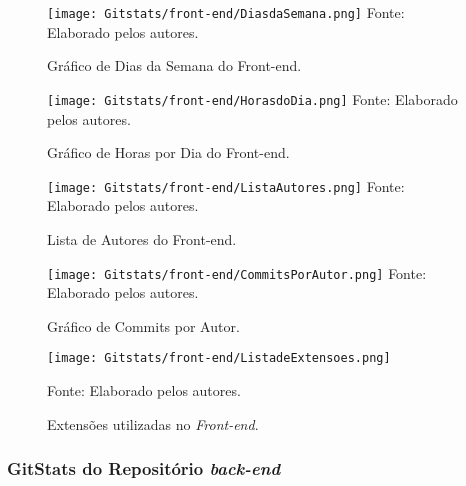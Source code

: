 \documentclass[
    12pt,               %
    openright,          %
    oneside,
    a4paper,            %
    BIBLATEX,           %
    TODO,               %
    english,            %
    brazil              %
    ]{ifsp-spo-inf-ctds}
\begin{document}
        \begin{figure}[H]
                \centering
                \caption{Gráfico de Dias da Semana do  Front-end.}
                \texttt{[image: Gitstats/front-end/DiasdaSemana.png]}
                {\footnotesize Fonte: Elaborado pelos autores.}
                \label{fig:diasemanaFront}
        \end{figure}  

        \begin{figure}[H]
                \centering
                \caption{Gráfico de Horas por Dia do Front-end.}
                \texttt{[image: Gitstats/front-end/HorasdoDia.png]}
                {\footnotesize Fonte: Elaborado pelos autores.}
                \label{fig:horasFront}
        \end{figure} 

        \begin{figure}[H]
                \centering
                \caption{Lista de Autores do
                Front-end.}
                \texttt{[image: Gitstats/front-end/ListaAutores.png]}
                {\footnotesize Fonte: Elaborado pelos autores.}
                \label{fig:autorFront}
        \end{figure}   

        \begin{figure}[H]
                \centering
                \caption{Gráfico de Commits por Autor.}
                \texttt{[image: Gitstats/front-end/CommitsPorAutor.png]}
                {\footnotesize Fonte: Elaborado pelos autores.}
                \label{fig:commitFront}
        \end{figure}   

        \begin{figure}[H]
                \centering
                \caption{Extensões utilizadas no \emph{Front-end}.}
                \texttt{[image: Gitstats/front-end/ListadeExtensoes.png]}
                
                {\footnotesize Fonte: Elaborado pelos autores.}
                \label{fig:extensaoFront}
        \end{figure}  



        \subsubsection{GitStats do Repositório \emph{back-end}}
\end{document}
